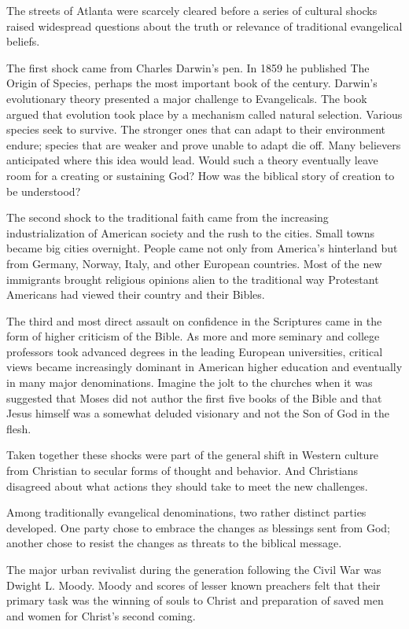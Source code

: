 The streets of Atlanta were scarcely cleared before a series of cultural shocks raised widespread
questions about the truth or relevance of traditional evangelical beliefs.

The first shock came from Charles Darwin’s pen. In 1859 he published The Origin of Species, perhaps
the most important book of the century. Darwin’s evolutionary theory presented a major challenge to
Evangelicals. The book argued that evolution took place by a mechanism called natural selection.
Various species seek to survive. The stronger ones that can adapt to their environment endure;
species that are weaker and prove unable to adapt die off. Many believers anticipated where this
idea would lead. Would such a theory eventually leave room for a creating or sustaining God? How was
the biblical story of creation to be understood?

The second shock to the traditional faith came from the increasing industrialization of American
society and the rush to the cities. Small towns became big cities overnight. People came not only
from America’s hinterland but from Germany, Norway, Italy, and other European countries. Most of the
new immigrants brought religious opinions alien to the traditional way Protestant Americans had
viewed their country and their Bibles.

The third and most direct assault on confidence in the Scriptures came in the form of higher
criticism of the Bible. As more and more seminary and college professors took advanced degrees in
the leading European universities, critical views became increasingly dominant in American higher
education and eventually in many major denominations. Imagine the jolt to the churches when it was
suggested that Moses did not author the first five books of the Bible and that Jesus himself was a
somewhat deluded visionary and not the Son of God in the flesh.

Taken together these shocks were part of the general shift in Western culture from Christian to
secular forms of thought and behavior. And Christians disagreed about what actions they should take
to meet the new challenges.

Among traditionally evangelical denominations, two rather distinct parties developed. One party
chose to embrace the changes as blessings sent from God; another chose to resist the changes as
threats to the biblical message.

The major urban revivalist during the generation following the Civil War was Dwight L. Moody. Moody
and scores of lesser known preachers felt that their primary task was the winning of souls to Christ
and preparation of saved men and women for Christ’s second coming.

